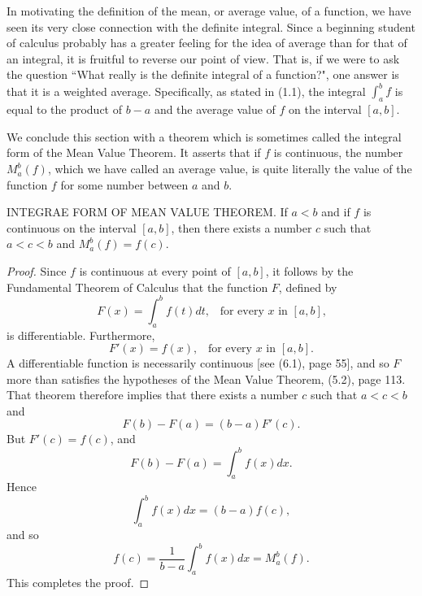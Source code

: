 In motivating the definition of the mean, or average value, of a function, we have seen its very close connection with the definite integral. Since a beginning student of calculus probably has a greater feeling for the idea of average than for that of an integral, it is fruitful to reverse our point of view.
That is, if we were to ask the question ``What really is the definite integral of a function?", one answer is that it is a weighted average. Specifically, as stated in (1.1), the integral $\int_a^bf$ is equal to the product of $b - a$ and the average value of $f$ on the interval $[a, b]$.

We conclude this section with a theorem which is sometimes called the integral form of the Mean Value Theorem. It asserts that if $f$ is continuous, the number $M_a^b(f)$, which we have called an average value, is quite literally the value of the function $f$ for some number between $a$ and $b$.
\medskip

\begin{theorem} %
INTEGRAE FORM OF MEAN VALUE THEOREM. 
If $a < b$ and if $f$ is continuous on the interval $[a, b]$, then there exists a number $c$ such that $a < c < b$ and $M_a^b(f) = f(c)$.
\end{theorem}


\begin{proof}
Since $f$ is continuous at every point of $[a, b]$, it follows by the Fundamental Theorem of Calculus that the function $F$, defined by
$$
F(x) = \int_a^b f(t) dt, \;\;\;\mbox{for every $x$ in $[a, b]$,}
$$
\noindent is differentiable. Furthermore,
$$
F'(x) = f (x), \;\;\;\mbox{for every $x$ in $[a, b]$.}
$$
A differentiable function is necessarily continuous [see (6.1), page 55], and so $F$ more than satisfies the hypotheses of the Mean Value Theorem, (5.2), page 113. That theorem therefore implies that there exists a number $c$ such that $a < c < b$ and
$$
F(b) - F(a) = (b - a)F'(c).
$$
But $F'(c) = f(c)$, and
$$
F(b) - F(a) = \int_a^b f(x)dx.
$$
Hence
$$
\int_a^b f (x) dx = (b - a) f(c), 
$$
and so 
$$
f(c) = \frac{1}{b - a} \int_a^b f(x) dx = M_a^b(f).
$$
This completes the proof.
\end{proof}
